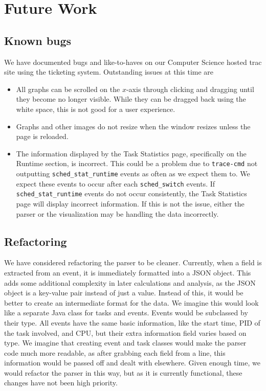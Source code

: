 \documentclass{hmcclinic}
\begin{document}
\chapter{Future Work}
\section{Known bugs}

  We have documented bugs and like-to-haves on our Computer Science hosted trac
  site using the ticketing system. Outstanding issues at this time are

  \begin{itemize}
  
  \item All graphs can be scrolled on the $x$-axis through clicking and dragging until they become no longer visible. While
    they can be dragged back using the white space, this is not good for a user
    experience.

  \item Graphs and other images do not resize when the window resizes unless the
    page is reloaded.

  \item The information displayed by the Task Statistics page, specifically on
    the Runtime section, is incorrect. This could be a problem due to
    \texttt{trace-cmd} not outputting \texttt{sched\_stat\_runtime} events as often
    as we expect them to. We expect these events to occur after each
    \texttt{sched\_switch} events. If \texttt{sched\_stat\_runtime} events do
    not occur consistently, the Task Statistics page will display incorrect
    information. If this is not the issue, either the parser
    or the visualization may be handling the data incorrectly.

\end{itemize}


  \section{Refactoring}

  We have considered refactoring the parser to be cleaner. Currently, when a
  field is extracted from an event, it is immediately formatted into a JSON
  object.  This adds some additional complexity in later calculations and
  analysis, as the JSON object is a key-value pair instead of just a value.
  Instead of this, it would be better to create an intermediate format for the
  data. We imagine this would look like a separate Java class for tasks and
  events. Events would be subclassed by their type. All events have the same
  basic information, like the start time, PID of the task involved, and CPU, but
  their extra information field varies based on type. We imagine that creating
  event and task classes would make the parser code much more readable, as after
  grabbing each field from a line, this information would be passed off and
  dealt with elsewhere. Given enough time, we would refactor the parser in this
  way, but as it is currently functional, these changes have not been high
  priority.
\end{document}
